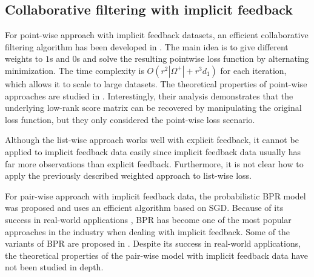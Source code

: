 \documentclass{article}
\numberwithin{equation}{section}
\newtheorem{sampling strategy}{Sampling Strategy}
\begin{document}
\subsection{Collaborative filtering with implicit feedback}



For point-wise approach with implicit feedback datasets, an efficient collaborative filtering algorithm has been developed in \cite{cfimplicit}. The main idea is to give different weights to $1$s and $0$s and solve the resulting pointwise loss function by alternating minimization. The time complexity is $O(r^2|\Omega^+| + r^3 d_1)$ for each iteration, which allows it to scale to large datasets. The theoretical properties of point-wise approaches are studied in \cite{1bit,hsieh2015pu}. Interestingly, their analysis demonstrates that the underlying low-rank score matrix can be recovered by manipulating the original loss function, but they only considered the point-wise loss scenario. 

Although the list-wise approach works well with explicit feedback, it cannot be applied to implicit feedback data easily since implicit feedback data usually has far more observations than explicit feedback. Furthermore, it is not clear how to apply the previously described weighted approach to list-wise loss. 

 For pair-wise approach with implicit feedback data, the probabilistic BPR model \cite{bpr} was proposed and uses an efficient algorithm based on SGD.
 Because of its success in real-world applications \cite{yahoo!, millionsongs}, BPR has become one of the most popular approaches in the industry when dealing
 with implicit feedback. Some of the variants of BPR are proposed in \cite{bprsample,bprsample2}. Despite its success in real-world applications, the theoretical properties of the  pair-wise model with implicit feedback data have not been studied in depth. 
 
\end{document}
